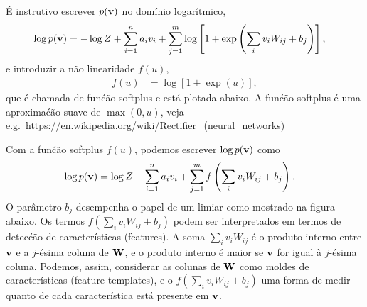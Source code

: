 \begin{exenumerate}
\begin{solution}
        \'E instrutivo escrever $p(\mathbf{v})$ no dom\'inio logar\'itmico,
        \begin{align}
            \log p(\mathbf{v}) & = -\log Z + \sum_{i=1}^n a_i v_i + \sum_{j=1}^m \log\left[1+ \exp\left(\sum_i v_i W_{ij} + b_j \right)\right],
        \end{align}
        e introduzir a n\~ao linearidade $f(u)$,
        \begin{align}
            f(u) & = \log\left[ 1+\exp(u) \right],
        \end{align}
        que \'e chamada de fun\'c\~ao softplus e est\'a plotada abaixo. A fun\'c\~ao softplus \'e uma aproxima\'c\~ao suave de $\max(0,u)$, veja e.g.\ \url{https://en.wikipedia.org/wiki/Rectifier_(neural_networks)}
        \begin{center}
            \vspace{3ex}
        \end{center}
        Com a fun\'c\~ao softplus $f(u)$, podemos escrever $\log p(\mathbf{v})$ como
        \begin{align}
            \log p(\mathbf{v}) & = \log Z + \sum_{i=1}^n a_i v_i + \sum_{j=1}^m f\left(\sum_i v_i W_{ij} + b_j \right).
        \end{align}
        O par\^ametro $b_j$ desempenha o papel de um limiar como mostrado na
        figura abaixo. Os termos $f\left(\sum_i v_i W_{ij} + b_j
        \right)$ podem ser interpretados em termos de detec\'c\~ao de caracter\'isticas (features). A
        soma $\sum_i v_i W_{ij}$ \'e o produto interno entre $\mathbf{v}$ e
        a $j$-\'esima coluna de $\mathbf{W}$, e o produto interno \'e maior se
        $\mathbf{v}$ for igual \`a $j$-\'esima coluna. Podemos, assim, considerar as colunas
        de $\mathbf{W}$ como moldes de caracter\'isticas (feature-templates), e o $f\left(\sum_i v_i
        W_{ij} + b_j \right)$ uma forma de medir quanto de cada caracter\'istica
        est\'a presente em $\mathbf{v}$.
        

\end{solution}
\end{exenumerate}
